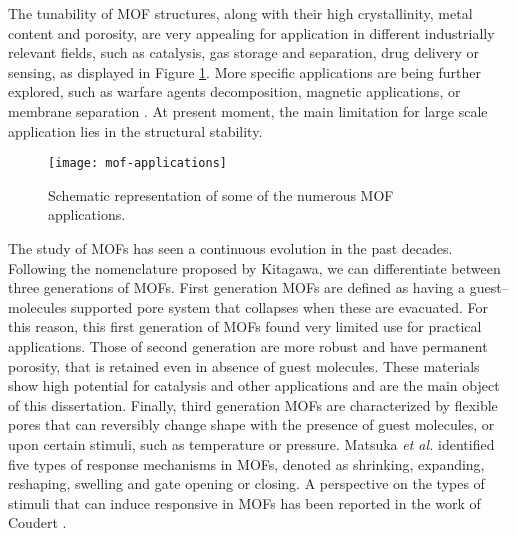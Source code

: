 \npar
The tunability of MOF structures, along with their high crystallinity, metal content and porosity, are very appealing for application in different industrially relevant fields, such as catalysis, gas storage and separation, drug delivery or sensing, as displayed in Figure \ref{fig:mof-applications}. More specific applications are being further explored, such as warfare agents decomposition, magnetic applications, or membrane separation \cite{furukawa2013chemistry}. At present moment, the main limitation for large scale application lies in the structural stability. 
%
%
\begin{figure}[htbp]
	\centering
 	\texttt{[image: mof-applications]}
	\caption{Schematic representation of some of the numerous MOF applications.}
	\label{fig:mof-applications}
\end{figure}
%
\npar
The study of MOFs has seen a continuous evolution in the past decades.
Following the nomenclature proposed by Kitagawa, we can differentiate between three generations of MOFs\cite{kitagawa1998functional}. First generation MOFs are defined as having a guest--molecules supported pore system that collapses when these are evacuated. For this reason, this first generation of MOFs found very limited use for practical applications. Those of second generation are more robust and have permanent porosity, that is retained even in absence of guest molecules. These materials show high potential for catalysis and other applications and are the main object of this dissertation. Finally, third generation MOFs are characterized by flexible pores that can reversibly change shape with the presence of guest molecules, or upon certain stimuli, such as temperature or pressure. Matsuka \textit{et al.}\cite{matsuda2004guest} identified five types of response mechanisms in MOFs, denoted as shrinking, expanding, reshaping, swelling and gate opening or closing. A perspective on the types of stimuli that can induce responsive in MOFs has been reported in the work of Coudert \cite{coudert2015responsive}.

